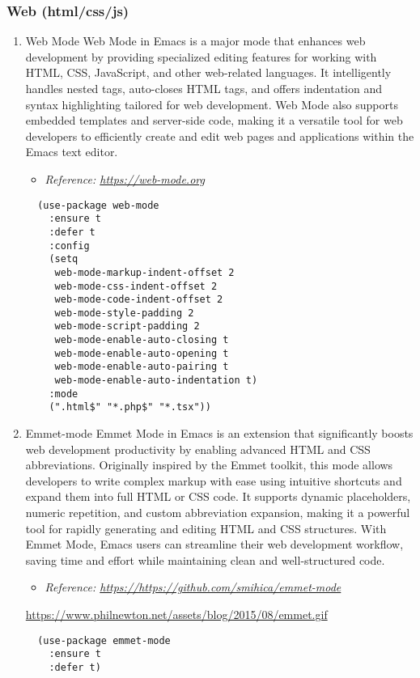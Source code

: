 \documentclass[11pt]{article}
\begin{document}
\subsubsection{Web (html/css/js)}
\label{sec:orgc704715}
\begin{enumerate}
\item Web Mode
\label{sec:orgedac496}
Web Mode in Emacs is a major mode that enhances web development by providing specialized editing features for working with HTML, CSS, JavaScript, and other web-related languages. It intelligently handles nested tags, auto-closes HTML tags, and offers indentation and syntax highlighting tailored for web development. Web Mode also supports embedded templates and server-side code, making it a versatile tool for web developers to efficiently create and edit web pages and applications within the Emacs text editor.

\begin{itemize}
\item \emph{Reference: \url{https://web-mode.org}}
\end{itemize}

\begin{verbatim}
  (use-package web-mode
    :ensure t
    :defer t
    :config
    (setq
     web-mode-markup-indent-offset 2
     web-mode-css-indent-offset 2
     web-mode-code-indent-offset 2
     web-mode-style-padding 2
     web-mode-script-padding 2
     web-mode-enable-auto-closing t
     web-mode-enable-auto-opening t
     web-mode-enable-auto-pairing t
     web-mode-enable-auto-indentation t)
    :mode
    (".html$" "*.php$" "*.tsx"))
\end{verbatim}
\item Emmet-mode
\label{sec:org3352673}
Emmet Mode in Emacs is an extension that significantly boosts web development productivity by enabling advanced HTML and CSS abbreviations. Originally inspired by the Emmet toolkit, this mode allows developers to write complex markup with ease using intuitive shortcuts and expand them into full HTML or CSS code. It supports dynamic placeholders, numeric repetition, and custom abbreviation expansion, making it a powerful tool for rapidly generating and editing HTML and CSS structures. With Emmet Mode, Emacs users can streamline their web development workflow, saving time and effort while maintaining clean and well-structured code.

\begin{itemize}
\item \emph{Reference: \url{https://https://github.com/smihica/emmet-mode}}
\end{itemize}

\url{https://www.philnewton.net/assets/blog/2015/08/emmet.gif}

\begin{verbatim}
  (use-package emmet-mode
    :ensure t
    :defer t)
\end{verbatim}
\end{enumerate}
\end{document}
